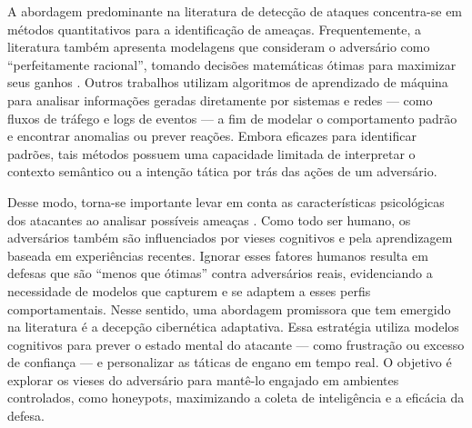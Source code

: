 \documentclass[12pt]{article}
\begin{document}
A abordagem predominante na literatura de detecção de ataques concentra-se em métodos quantitativos para a identificação de ameaças. Frequentemente, a literatura também apresenta modelagens que consideram o adversário como ``perfeitamente racional'', tomando decisões matemáticas ótimas para maximizar seus ganhos \cite{xu2015exploring}. Outros trabalhos utilizam algoritmos de aprendizado de máquina para analisar informações geradas diretamente por sistemas e redes — como fluxos de tráfego\cite{sscl-ids} e logs de eventos\cite{du2017deeplog} — a fim de modelar o comportamento padrão e encontrar anomalias ou prever reações. Embora eficazes para identificar padrões, tais métodos possuem uma capacidade limitada de interpretar o contexto semântico ou a intenção tática por trás das ações de um adversário.

Desse modo, torna-se 
importante levar em conta as características psicológicas dos atacantes ao analisar possíveis ameaças \cite{rich2025cyberpsychology}. Como todo ser humano, os adversários também são influenciados por vieses cognitivos e pela aprendizagem baseada em experiências recentes\cite{simon1956rational}. Ignorar esses fatores humanos resulta em defesas que são ``menos que ótimas'' contra adversários reais, evidenciando a necessidade de modelos que capturem e se adaptem a esses perfis comportamentais. 
Nesse sentido, uma abordagem promissora que tem emergido na literatura é a decepção cibernética adaptativa. Essa estratégia utiliza modelos cognitivos para prever o estado mental do atacante — como frustração ou excesso de confiança — e personalizar as táticas de engano em tempo real\cite{zhu2021defensive}. O objetivo é explorar os vieses do adversário para mantê-lo engajado em ambientes controlados, como honeypots, maximizando a coleta de inteligência e a eficácia da defesa.
\end{document}
